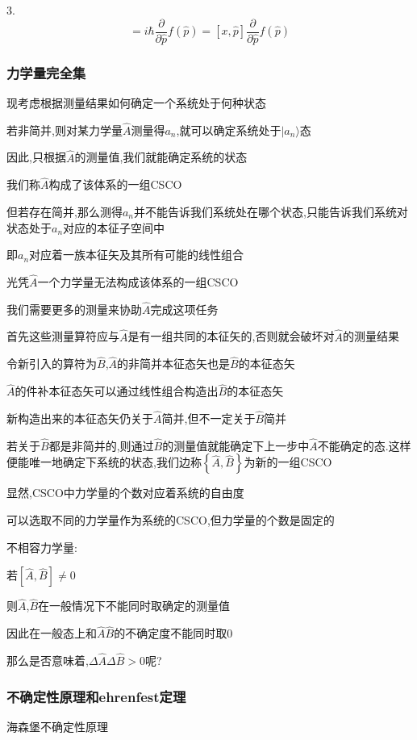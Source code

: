 \documentclass[lang=cn,15pt]{elegantbook}
\begin{document}
3.\begin{equation*}
	[x,f(\hat{p})]=i\hbar \frac{\partial}{\partial \hat{p}}f\left( \hat{p} \right) =\left[ x,\hat{p} \right] \frac{\partial}{\partial \hat{p}}f\left( \hat{p} \right) 
\end{equation*}
\subsubsection{力学量完全集}

现考虑根据测量结果如何确定一个系统处于何种状态

若非简并,则对某力学量$\hat{A}$测量得$a_n$,就可以确定系统处于$|a_n\rangle$态

因此,只根据$\hat{A}$的测量值,我们就能确定系统的状态

我们称$\hat{A}$构成了该体系的一组CSCO

但若存在简并,那么测得$a_n$并不能告诉我们系统处在哪个状态,只能告诉我们系统对状态处于$a_n$对应的本征子空间中

即$a_n$对应着一族本征矢及其所有可能的线性组合

光凭$\hat{A}$一个力学量无法构成该体系的一组CSCO

我们需要更多的测量来协助$\hat{A}$完成这项任务

首先这些测量算符应与$\hat{A}$是有一组共同的本征矢的,否则就会破坏对$\hat{A}$的测量结果

令新引入的算符为$\hat{B}$,$\hat{A}$的非简并本征态矢也是$\hat{B}$的本征态矢

$\hat{A}$的件补本征态矢可以通过线性组合构造出$\hat{B}$的本征态矢

新构造出来的本征态矢仍关于$\hat{A}$简并,但不一定关于$\hat{B}$简并

若关于$\hat{B}$都是非简并的,则通过$\hat{B}$的测量值就能确定下上一步中$\hat{A}$不能确定的态.这样便能唯一地确定下系统的状态,我们边称$ \left\lbrace \hat{A},\hat{B}\right\rbrace $为新的一组CSCO

显然,CSCO中力学量的个数对应着系统的自由度

可以选取不同的力学量作为系统的CSCO,但力学量的个数是固定的

不相容力学量:

若$[ \hat{A} ,\hat{B} ]\ne 0$

则$\hat{A}$,$\hat{B}$在一般情况下不能同时取确定的测量值

因此在一般态上和$\hat{A}$$\hat{B}$的不确定度不能同时取0

那么是否意味着,$\varDelta\hat{A}\varDelta\hat{B}>0$呢?
\subsubsection{不确定性原理和ehrenfest定理}
海森堡不确定性原理
\end{document}
